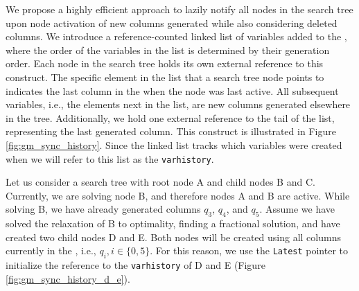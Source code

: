 We propose a highly efficient approach to lazily notify all nodes in the search tree upon node activation of new columns generated while also considering deleted columns. We introduce a reference-counted linked list of variables added to the \RMP{}, where the order of the variables in the list is determined by their generation order. Each node in the search tree holds its own external reference to this construct. The specific element in the list that a search tree node points to indicates the last column in the \RMP{} when the node was last active. All subsequent variables, i.e., the elements next in the list, are new columns generated elsewhere in the tree. Additionally, we hold one external reference to the tail of the list, representing the last generated column. This construct is illustrated in Figure \ref{fig:gm_sync_history}. Since the linked list tracks which variables were created when we will refer to this list as the \texttt{varhistory}.

Let us consider a search tree with root node A and child nodes B and C. Currently, we are solving node B, and therefore nodes A and B are active. While solving B, we have already generated columns $q_3$, $q_4$, and $q_5$. Assume we have solved the relaxation of B to optimality, finding a fractional solution, and have created two child nodes D and E. Both nodes will be created using all columns currently in the \RMP{}, i.e., $q_i, i \in \{0, 5\}$. For this reason, we use the \texttt{Latest} pointer to initialize the reference to the \texttt{varhistory} of D and E (Figure \ref{fig:gm_sync_history_d_e}).

